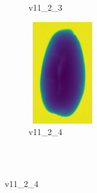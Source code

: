 \documentclass[11pt]{article}
\begin{document}
\begin{figure}
\begin{subfigure}[b]{0.15\textwidth}
        \caption{v11\_2\_3}
         \label{fig:five over x}
     \end{subfigure}
     \hfill
    \begin{subfigure}[b]{0.15\textwidth}
         \centering
         \includegraphics[width=3cm, height=4.5cm]{images/kartofler/v11_2_4_cut.png}
        \caption{v11\_2\_4}
         \label{fig:five over x}
     \end{subfigure}
     
     
        \\ \\
        

\end{figure}
\end{document}

